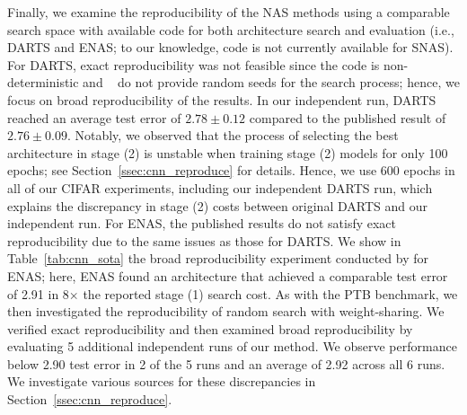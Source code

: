 \documentclass[acmlarge, nonacm]{acmart}
\begin{document}
Finally, we examine the reproducibility of the NAS methods using a comparable search space with available code for both architecture search and evaluation (i.e., DARTS and ENAS; to our knowledge, code is not currently available for SNAS).
For DARTS, exact reproducibility was not feasible since the code is non-deterministic and ~\citet{liu2018darts} do not provide random seeds for the search process; hence, we focus on broad reproducibility of the results.  In our independent run, DARTS reached an average test error of $2.78\pm 0.12$ compared to the published result of $2.76\pm 0.09$.  Notably, we observed that the process of selecting the best architecture in stage (2) is unstable when training stage (2) models for only 100 epochs; see Section~\ref{ssec:cnn_reproduce} for details. Hence, we use 600 epochs in all of our CIFAR experiments, including our independent DARTS run, which explains the discrepancy in stage (2) costs between original DARTS and our independent run.
For ENAS, the published results do not satisfy exact reproducibility due to the same issues as those for DARTS.  
We show in Table~\ref{tab:cnn_sota} the broad reproducibility experiment conducted by \citet{liu2018darts} for ENAS; here, ENAS found an architecture that achieved a comparable test error of 2.91 in 8$\times$ the reported stage (1) search cost.
As with the PTB benchmark, we then investigated the reproducibility of random search with weight-sharing. 
We verified exact reproducibility and then examined broad reproducibility by evaluating 5 additional independent runs of our method. We observe performance below 2.90 test error in 2 of the 5 runs and an average of 2.92 across all 6 runs. We investigate various sources for these discrepancies in Section~\ref{ssec:cnn_reproduce}.  
\end{document}
